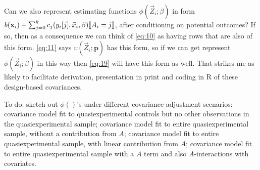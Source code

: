 \documentclass{article}
\DeclarePairedDelimiter{\indicator}{\llbracket}{\rrbracket}
\newcommand{\absorbInterceptsEF}{\upsilon}
\begin{document}
Can we also represent estimating functions
$\phi(\vec{Z}_{i}; \beta)$ in form
$b(\mathbf{x}_{i}) + \sum_{j=0}^{k}c_{j}(y_{i}[j], \vec{x}_{i}, \beta)\indicator{A_{i}=j}$, after conditioning
on potential outcomes? If so, then as a consequence we can think of
\eqref{eq:10} as having rows that are also of this form.
\eqref{eq:11} says $\absorbInterceptsEF(\vec{Z}_{i}; \mathbf{p})$
has this form, so if we can get represent
$\phi(\vec{Z}_{i}; \beta)$ in this way then \eqref{eq:19}
will have this form as well. That strikes me as likely to facilitate
derivation, 
presentation in print and coding in R of these design-based covariances. 

To do:
sketch out $\phi()$'s under different covariance adjustment scenarios:
covariance model fit to quasiexperimental controls but no other
observations in the quasiexperimental sample; covariance model fit to
entire quasiexperimental sample, without a contribution from $A$;
covariance model fit to entire quasiexperimental sample, with linear
contribution from $A$; covariance model fit to entire
quasiexperimental sample with a $A$ term and also $A$-interactions
with covariates.

\end{document}

